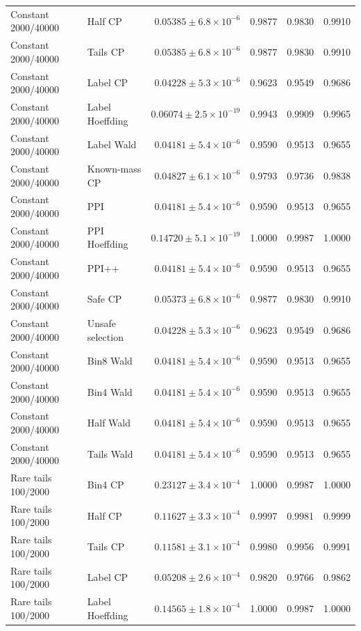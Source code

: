 \begin{longtable}{llrrrr}
Constant 2000/40000 & Half CP & $0.05385\pm 6.8\times 10^{-6}$ & 0.9877 & 0.9830 & 0.9910 \\
Constant 2000/40000 & Tails CP & $0.05385\pm 6.8\times 10^{-6}$ & 0.9877 & 0.9830 & 0.9910 \\
Constant 2000/40000 & Label CP & $0.04228\pm 5.3\times 10^{-6}$ & 0.9623 & 0.9549 & 0.9686 \\
Constant 2000/40000 & Label Hoeffding & $0.06074\pm 2.5\times 10^{-19}$ & 0.9943 & 0.9909 & 0.9965 \\
Constant 2000/40000 & Label Wald & $0.04181\pm 5.4\times 10^{-6}$ & 0.9590 & 0.9513 & 0.9655 \\
Constant 2000/40000 & Known-mass CP & $0.04827\pm 6.1\times 10^{-6}$ & 0.9793 & 0.9736 & 0.9838 \\
Constant 2000/40000 & PPI & $0.04181\pm 5.4\times 10^{-6}$ & 0.9590 & 0.9513 & 0.9655 \\
Constant 2000/40000 & PPI Hoeffding & $0.14720\pm 5.1\times 10^{-19}$ & 1.0000 & 0.9987 & 1.0000 \\
Constant 2000/40000 & PPI++ & $0.04181\pm 5.4\times 10^{-6}$ & 0.9590 & 0.9513 & 0.9655 \\
Constant 2000/40000 & Safe CP & $0.05373\pm 6.8\times 10^{-6}$ & 0.9877 & 0.9830 & 0.9910 \\
Constant 2000/40000 & Unsafe selection & $0.04228\pm 5.3\times 10^{-6}$ & 0.9623 & 0.9549 & 0.9686 \\
Constant 2000/40000 & Bin8 Wald & $0.04181\pm 5.4\times 10^{-6}$ & 0.9590 & 0.9513 & 0.9655 \\
Constant 2000/40000 & Bin4 Wald & $0.04181\pm 5.4\times 10^{-6}$ & 0.9590 & 0.9513 & 0.9655 \\
Constant 2000/40000 & Half Wald & $0.04181\pm 5.4\times 10^{-6}$ & 0.9590 & 0.9513 & 0.9655 \\
Constant 2000/40000 & Tails Wald & $0.04181\pm 5.4\times 10^{-6}$ & 0.9590 & 0.9513 & 0.9655 \\
Rare tails 100/2000 & Bin4 CP & $0.23127\pm 3.4\times 10^{-4}$ & 1.0000 & 0.9987 & 1.0000 \\
Rare tails 100/2000 & Half CP & $0.11627\pm 3.3\times 10^{-4}$ & 0.9997 & 0.9981 & 0.9999 \\
Rare tails 100/2000 & Tails CP & $0.11581\pm 3.1\times 10^{-4}$ & 0.9980 & 0.9956 & 0.9991 \\
Rare tails 100/2000 & Label CP & $0.05208\pm 2.6\times 10^{-4}$ & 0.9820 & 0.9766 & 0.9862 \\
Rare tails 100/2000 & Label Hoeffding & $0.14565\pm 1.8\times 10^{-4}$ & 1.0000 & 0.9987 & 1.0000 \\

\end{longtable}
